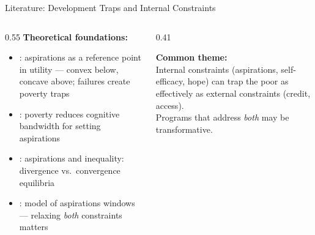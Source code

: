 \documentclass[aspectratio=169, 10pt]{beamer}
\begin{document}
\begin{frame}{Literature: Development Traps and Internal Constraints}
  \begin{columns}
    \begin{column}{0.55\textwidth}
      \textbf{Theoretical foundations:}
      \begin{itemize}
        \item \citealt{Ray2006}: aspirations as a reference point in utility --- convex below, concave above; failures create poverty traps
        \item \citealt{Dalton2016}: poverty reduces cognitive bandwidth for setting aspirations
        \item \citealt{Genicot2017}: aspirations and inequality: divergence vs.\ convergence equilibria
        \item \citealt{Lybbert2018}: model of aspirations windows --- relaxing \emph{both} constraints matters
      \end{itemize}
    \end{column}
    \begin{column}{0.41\textwidth}
      \begin{keybox}
        \textbf{Common theme:}\\[0.4em]
        Internal constraints (aspirations, self-efficacy, hope) can trap the poor as effectively as external constraints (credit, access).\\[0.5em]
        Programs that address \emph{both} may be transformative.
      \end{keybox}
    \end{column}
  \end{columns}
\end{frame}
\end{document}
